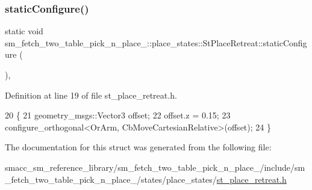 \subsubsection{\texorpdfstring{static\+Configure()}{staticConfigure()}}
{\footnotesize\ttfamily static void sm\+\_\+fetch\+\_\+two\+\_\+table\+\_\+pick\+\_\+n\+\_\+place\+\_\+::place\+\_\+states\+::\+St\+Place\+Retreat\+::static\+Configure (\begin{DoxyParamCaption}{ }\end{DoxyParamCaption})\hspace{0.3cm}{\ttfamily [inline]}, {\ttfamily [static]}}



Definition at line 19 of file st\+\_\+place\+\_\+retreat.\+h.


\begin{DoxyCode}
20     \{
21         geometry\_msgs::Vector3 offset;
22         offset.z = 0.15;
23         configure\_orthogonal<OrArm, CbMoveCartesianRelative>(offset);
24     \}
\end{DoxyCode}


The documentation for this struct was generated from the following file\+:\begin{DoxyCompactItemize}
\item 
smacc\+\_\+sm\+\_\+reference\+\_\+library/sm\+\_\+fetch\+\_\+two\+\_\+table\+\_\+pick\+\_\+n\+\_\+place\+\_/include/sm\+\_\+fetch\+\_\+two\+\_\+table\+\_\+pick\+\_\+n\+\_\+place\+\_/states/place\+\_\+states/\hyperlink{sm__fetch__two__table__pick__n__place__1_2include_2sm__fetch__two__table__pick__n__place__1_2stab7946e2a646ebe9ea3ad5e38911e4f76}{st\+\_\+place\+\_\+retreat.\+h}\end{DoxyCompactItemize}
